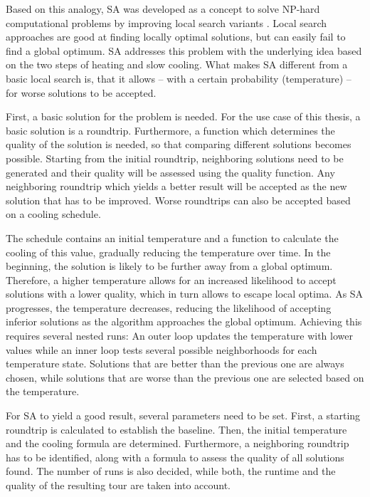 Based on this analogy, SA was developed as a concept to solve NP-hard computational problems by improving local search variants \cite{aarts_simulated_2005, eglese_simulated_1990}.
Local search approaches are good at finding locally optimal solutions, but can easily fail to find a global optimum.
SA addresses this problem with the underlying idea based on the two steps of heating and slow cooling.
What makes SA different from a basic local search is, that it allows -- with a certain probability (temperature) -- for worse solutions to be accepted.

First, a basic solution for the problem is needed.
For the use case of this thesis, a basic solution is a roundtrip.
Furthermore, a function which determines the quality of the solution is needed, so that comparing different solutions becomes possible. 
Starting from the initial roundtrip, neighboring solutions need to be generated and their quality will be assessed using the quality function.
Any neighboring roundtrip which yields a better result will be accepted as the new solution that has to be improved.
Worse roundtrips can also be accepted based on a cooling schedule.

The schedule contains an initial temperature and a function to calculate the cooling of this value, gradually reducing the temperature over time.
In the beginning, the solution is likely to be further away from a global optimum.
Therefore, a higher temperature allows for an increased likelihood to accept solutions with a lower quality, which in turn allows to escape local optima.
As SA progresses, the temperature decreases, reducing the likelihood of accepting inferior solutions as the algorithm approaches the global optimum. 
Achieving this requires several nested runs:
An outer loop updates the temperature with lower values while an inner loop tests several possible neighborhoods for each temperature state. 
Solutions that are better than the previous one are always chosen, while solutions that are worse than the previous one are selected based on the temperature.


For SA to yield a good result, several parameters need to be set. 
First, a starting roundtrip is calculated to establish the baseline.
Then, the initial temperature and the cooling formula are determined.
Furthermore, a neighboring roundtrip has to be identified, along with a formula to assess the quality of all solutions found.
The number of runs is also decided, while both, the runtime and the quality of the resulting tour are taken into account.

